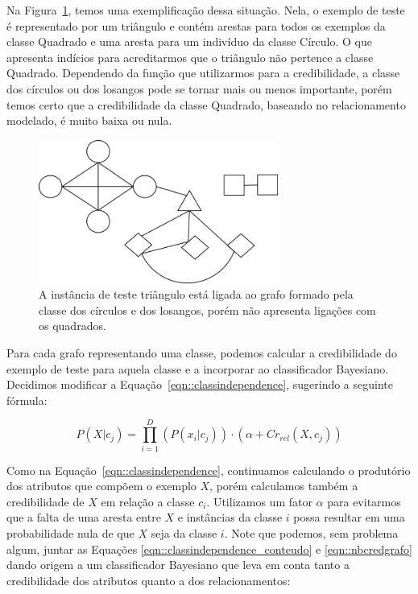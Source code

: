 Na Figura~\ref{fig::grafo}, temos uma exemplificação dessa situação. Nela, o exemplo de teste é representado por um triângulo e contém arestas para todos os exemplos da classe Quadrado e uma aresta para um indivíduo da classe Círculo. O que apresenta indícios para acreditarmos que o triângulo não pertence a classe Quadrado. Dependendo da função que utilizarmos para a credibilidade, a classe dos círculos ou dos losangos pode se tornar mais ou menos importante, porém temos certo que a credibilidade da classe Quadrado, baseando no relacionamento modelado, é muito baixa ou nula.

\begin{figure}[ht!]
\centering
\includegraphics[width=0.7\textwidth]{figures/grafo.png}
\caption{A instância de teste triângulo está ligada ao grafo formado pela classe dos círculos e dos losangos, porém não apresenta ligações com os quadrados.}
\label{fig::grafo}
\end{figure}

Para cada grafo representando uma classe, podemos calcular a credibilidade do exemplo de teste para aquela classe e a incorporar ao classificador Bayesiano. Decidimos modificar a Equação~\ref{eqn::classindependence}, sugerindo a seguinte fórmula:

\begin{equation}\label{eqn::nbcredgrafo}
P(X|c_{j}) = \prod^{D}_{i=1}{(P(x_i|c_j)) \cdot (\alpha + Cr_{rel}(X,c_j)) } 
\end{equation}

Como na Equação~\ref{eqn::classindependence}, continuamos calculando o produtório dos atributos que compõem o exemplo $X$, porém calculamos também a credibilidade de $X$ em relação a classe $c_i$. Utilizamos um fator $\alpha$ para evitarmos que a falta de uma aresta entre $X$ e instâncias da classe $i$ possa resultar em uma probabilidade nula de que $X$ seja da classe $i$. Note que podemos, sem problema algum, juntar as Equações \ref{eqn::classindependence_conteudo} e \ref{eqn::nbcredgrafo} dando origem a um classificador Bayesiano que leva em conta tanto a credibilidade dos atributos quanto a dos relacionamentos:

